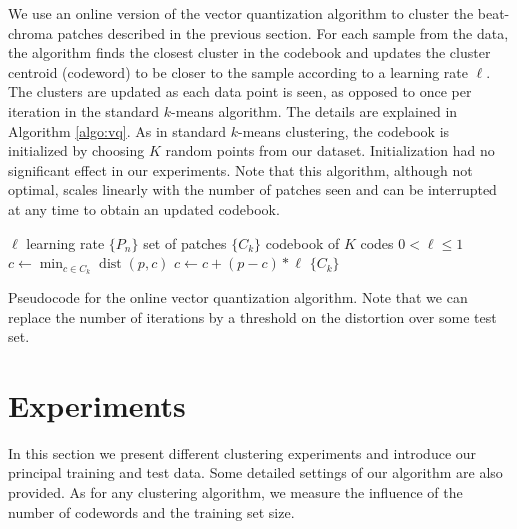 \documentclass{article}
\DeclareMathOperator*{\dist}{dist}
\begin{document}
We use an online version of the vector quantization algorithm
\cite{Gersho1991} to cluster the beat-chroma patches described in the
previous section.
For each sample from the data, the algorithm finds the closest cluster
in the codebook and updates the cluster centroid (codeword) to be
closer to the sample according to a learning rate $\ell$.
The clusters are updated as each data point is seen, as opposed to
once per iteration in the standard $k$-means algorithm.
The details are explained in Algorithm \ref{algo:vq}.
%
As in standard $k$-means clustering, the codebook is initialized by
choosing $K$ random points from our dataset.
Initialization had no significant effect in our experiments.
%
Note that this algorithm, although not optimal, scales linearly with
the number of patches seen and can be interrupted at any time
to obtain an updated codebook. %

\begin{algorithm}
\begin{algorithmic}
\STATE$\ell$ learning rate
\STATE$\{P_n\}$ set of patches
\STATE$\{C_k\}$ codebook of $K$ codes
\REQUIRE $0 < \ell \leq 1$
\STATE$c \leftarrow \min_{c \in C_k} \dist(p,c)$
\STATE$c \leftarrow c + (p - c) * \ell$
\ENDFOR
\ENDFOR
\RETURN $\{C_k\}$
\caption{\small{Pseudocode for the online vector quantization
    algorithm. Note that we can replace the number of iterations by a
    threshold on the distortion over some test set.}
\label{algo:vq}}
\end{algorithmic}
\end{algorithm}



\section{Experiments}\label{sec:experiments}
In this section we present different clustering experiments and introduce
our principal training and test data. Some detailed settings
of our algorithm are also provided. As for any clustering algorithm, we
measure the influence of the number of codewords and the training set size.
\end{document}
